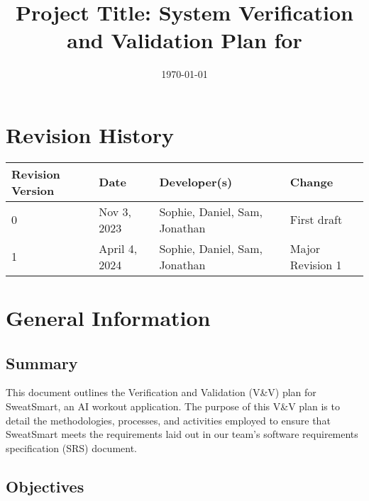 \documentclass[12pt, titlepage]{article}
\begin{document}
    \title{Project Title: System Verification and Validation Plan for \progname{}}
    \author{\authname}
    \date{\today}

    \maketitle


    \section*{Revision History}

    \begin{table}[hp]
        \centering
        \begin{tabularx}{\textwidth}{lllX}
            \toprule
            \textbf{Revision Version} & \textbf{Date} & \textbf{Developer(s)} & \textbf{Change}\\
            \midrule
            0 & Nov 3, 2023 & Sophie, Daniel, Sam, Jonathan & First draft\\
            1 & April 4, 2024 & Sophie, Daniel, Sam, Jonathan & Major Revision 1\\
            \bottomrule
        \end{tabularx}
    \end{table}

    \newpage

    \tableofcontents

    \listoftables


    \newpage

    \section{General Information}

    \subsection{Summary}

    This document outlines the Verification and Validation (V\&V) plan for SweatSmart, an AI workout application. The purpose of this V\&V plan is to detail the methodologies, processes, and activities employed to ensure that SweatSmart meets the requirements laid out in our team’s software requirements specification (SRS) document.

    \subsection{Objectives}
\end{document}
